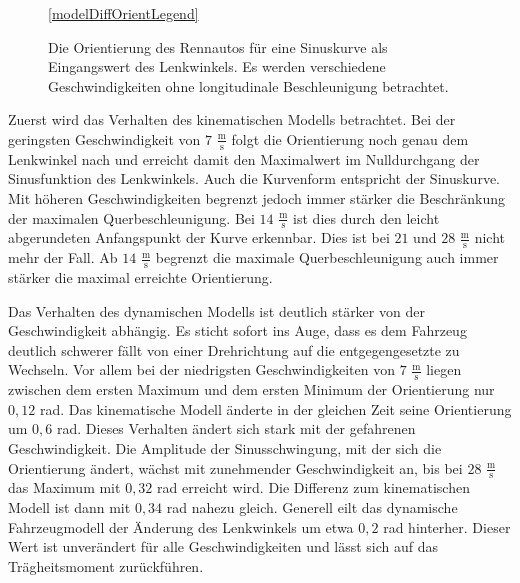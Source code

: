 \documentclass{like}
\begin{document}
\begin{figure}
	\centering
	\subfigure{
		 
	}%
	\subfigure{
		 
	}	
	
	\ref{modelDiffOrientLegend}
	\caption{Die Orientierung des Rennautos für eine Sinuskurve als Eingangswert des Lenkwinkels. Es werden verschiedene Geschwindigkeiten ohne longitudinale Beschleunigung betrachtet.}\label{fig:modelDiffOrient}
\end{figure}

Zuerst wird das Verhalten des kinematischen Modells betrachtet. Bei der geringsten Geschwindigkeit von $7$ $\frac{\text{m}}{\text{s}}$ folgt die Orientierung noch genau dem Lenkwinkel nach und erreicht damit den Maximalwert im Nulldurchgang der Sinusfunktion des Lenkwinkels. Auch die Kurvenform entspricht der Sinuskurve. Mit höheren Geschwindigkeiten begrenzt jedoch immer stärker die Beschränkung der maximalen Querbeschleunigung. Bei $14$ $\frac{\text{m}}{\text{s}}$ ist dies durch den leicht abgerundeten An\-fangs\-punkt der Kurve erkennbar. Dies ist bei $21$ und $28$ $\frac{\text{m}}{\text{s}}$ nicht mehr der Fall. Ab  $14$ $\frac{\text{m}}{\text{s}}$ begrenzt die maximale Querbeschleunigung auch immer stärker die maximal erreichte Orientierung. 

Das Verhalten des dynamischen Modells ist deutlich stärker von der Geschwindigkeit abhängig. Es sticht sofort ins Auge, dass es dem Fahrzeug deutlich schwerer fällt von einer Drehrichtung auf die entgegengesetzte zu Wechseln. Vor allem bei der niedrigsten Geschwindigkeiten von $7$ $\frac{\text{m}}{\text{s}}$ liegen zwischen dem ersten Maximum und dem ersten Minimum der Orientierung nur $0,12$ rad. Das kinematische Modell änderte in der gleichen Zeit seine Orientierung um $0,6$ rad. Dieses Verhalten ändert sich stark mit der gefahrenen Geschwindigkeit. Die Amplitude der Sinusschwingung, mit der sich die Orientierung ändert, wächst mit zunehmender Geschwindigkeit an, bis bei $28$ $\frac{\text{m}}{\text{s}}$ das Maximum mit $0,32$ rad erreicht wird. Die Differenz zum kinematischen Modell ist dann mit $0,34$ rad nahezu gleich. Generell eilt das dynamische Fahrzeugmodell der Änderung des Lenkwinkels um etwa $0,2$ rad hinterher. Dieser Wert ist unverändert für alle Geschwindigkeiten und lässt sich auf das Trägheitsmoment zurückführen.
\end{document}
